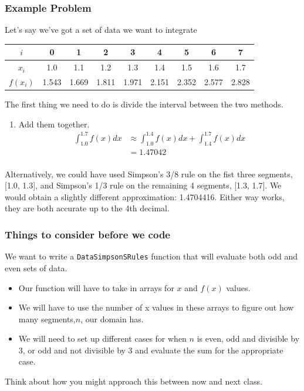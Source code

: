 \documentclass{if-beamer}
\begin{document}
\begin{frame}
	\frametitle{Example Problem}
	Let's say we've got a set of data we want to integrate
	\begin{table}
		\begin{tabular}{c| c c c c c c c c}
			$i$ &0& 1&2&3&4&5&6&7 \\
			\hline
			$x_i$& 1.0 &1.1&1.2&1.3&1.4&1.5&1.6&1.7\\
			$f(x_i)$&1.543&1.669&1.811&1.971&2.151&2.352&2.577&2.828\\
			
		\end{tabular}
	\end{table}
	The first thing we need to do is divide the interval between the two methods. \\\vspace{5pt}
	\begin{enumerate}[3]
		\item Add them together.
		\begin{align*}
		\int_{1.0}^{1.7}f(x)dx &\approx \int_{1.0}^{1.4}f(x)dx + \int_{1.4}^{1.7}f(x)dx\\
		&=1.47042\\
		\end{align*}
	\end{enumerate}	
Alternatively, we could have used Simpson’s 3/8 rule on the fist three segments, [1.0, 1.3], and Simpson’s 1/3 rule on the remaining 4 segments, [1.3, 1.7]. We would obtain a slightly different approximation: 1.4704416. Either way works, they are both accurate up to the 4th decimal. 
\end{frame}

\begin{frame}
	\frametitle{Things to consider before we code}
	We want to write a \texttt{DataSimpsonSRules} function that will evaluate both odd and even sets of data. 
		\begin{itemize}
			\item Our function will have to take in arrays for $x$ and $f(x)$ values.
			\item We will have to use the number of x values in these arrays to figure out how many segments,$n$, our domain has. 
			\item We will need to set up different cases for when $n$ is even, odd and divisible by 3, or odd and not divisible by 3 and evaluate the sum for the appropriate case. \\\vspace{10pt}
		\end{itemize}
	Think about how you might approach this between now and next class.
\end{frame}
\end{document}
